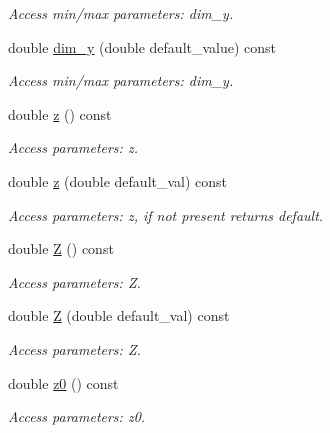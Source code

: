 \begin{DoxyCompactItemize}
\begin{DoxyCompactList}\small\item\em Access min/max parameters: dim\_\-y. \item\end{DoxyCompactList}\item 
double \hyperlink{struct_d_d4hep_1_1_x_m_l_1_1_dimension_aee1c5cc11394f26c6bce53ef3d9f1031}{dim\_\-y} (double default\_\-value) const 
\begin{DoxyCompactList}\small\item\em Access min/max parameters: dim\_\-y. \item\end{DoxyCompactList}\item 
double \hyperlink{struct_d_d4hep_1_1_x_m_l_1_1_dimension_a5a82a707d17136f4f6b460dd97d5eea0}{z} () const 
\begin{DoxyCompactList}\small\item\em Access parameters: z. \item\end{DoxyCompactList}\item 
double \hyperlink{struct_d_d4hep_1_1_x_m_l_1_1_dimension_aad40ddf84c2b42cf7ba0cbfa88900926}{z} (double default\_\-val) const 
\begin{DoxyCompactList}\small\item\em Access parameters: z, if not present returns default. \item\end{DoxyCompactList}\item 
double \hyperlink{struct_d_d4hep_1_1_x_m_l_1_1_dimension_a0ee088d7d7df2b8be91f5b453cc23224}{Z} () const 
\begin{DoxyCompactList}\small\item\em Access parameters: Z. \item\end{DoxyCompactList}\item 
double \hyperlink{struct_d_d4hep_1_1_x_m_l_1_1_dimension_a577fa767793aa6ae4bba2cde1deaec41}{Z} (double default\_\-val) const 
\begin{DoxyCompactList}\small\item\em Access parameters: Z. \item\end{DoxyCompactList}\item 
double \hyperlink{struct_d_d4hep_1_1_x_m_l_1_1_dimension_ac2a0b56de03d8f4e6b04618a048bbd46}{z0} () const 
\begin{DoxyCompactList}\small\item\em Access parameters: z0. \item\end{DoxyCompactList}\item 

\end{DoxyCompactItemize}
